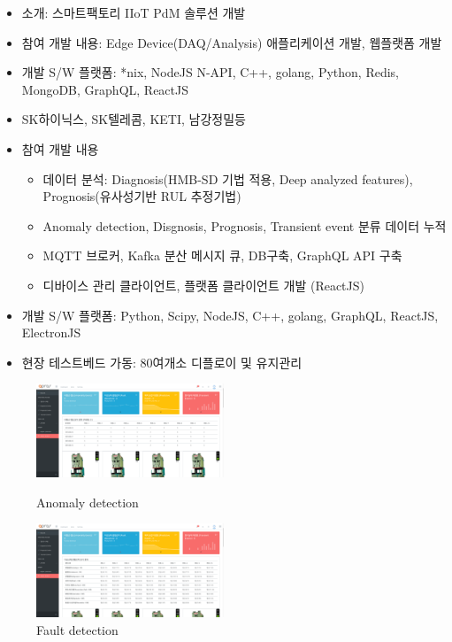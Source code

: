 \documentclass[10pt,a4paper,ragged2e]{altacv}
\begin{document}
\begin{fullwidth}
\begin{itemize}
\item 소개: 스마트팩토리 IIoT PdM 솔루션 개발
\item 참여 개발 내용: Edge Device(DAQ/Analysis) 애플리케이션 개발, 웹플랫폼 개발
\item 개발 S/W 플랫폼: *nix, NodeJS N-API, C++, golang, Python, Redis, MongoDB, GraphQL, ReactJS
\item SK하이닉스, SK텔레콤, KETI, 남강정밀등
\item 참여 개발 내용
  \begin{itemize}
    \item 데이터 분석: Diagnosis(HMB-SD 기법 적용, Deep analyzed features), Prognosis(유사성기반 RUL 추정기법)
    \item Anomaly detection, Disgnosis, Prognosis, Transient event 분류 데이터 누적
    \item MQTT 브로커, Kafka 분산 메시지 큐, DB구축, GraphQL API 구축
    \item 디바이스 관리 클라이언트, 플랫폼 클라이언트 개발 (ReactJS)
  \end{itemize}
\item 개발 S/W 플랫폼: Python, Scipy, NodeJS, C++, golang, GraphQL, ReactJS, ElectronJS
\item 현장 테스트베드 가동: 80여개소 디플로이 및 유지관리
\end{itemize}
\begin{figure}[!ht]
  \begin{fullwidth}
    \parbox{0.5\textwidth}{
    \centering
    \includegraphics[width=0.5\textwidth]{images/new_dashboard_02.png}
    \caption*{Anomaly detection}
    }\qquad
    \parbox{0.5\textwidth}{
    \centering
    \includegraphics[width=0.5\textwidth]{images/new_dashboard_03.png}
    \caption*{Fault detection}
    }\qquad
    \parbox{0.5\textwidth}{
}
\end{fullwidth}
\end{figure}
\end{fullwidth}
\end{document}
